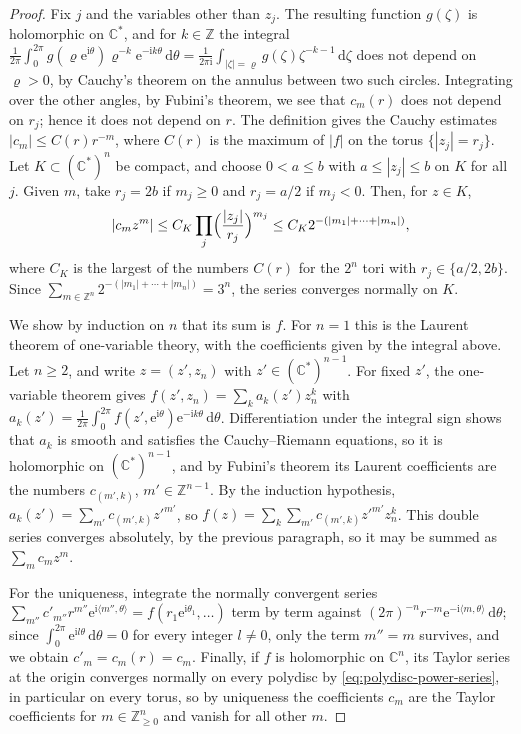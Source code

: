 \begin{proof}
Fix $j$ and the variables other than $z_j$. The resulting function $g(\zeta)$ is holomorphic on $\mathbb C^*$, and for $k\in\mathbb Z$ the integral $\frac1{2\pi}\int_0^{2\pi}g(\varrho\mathrm e^{\mathrm i\theta})\varrho^{-k}\mathrm e^{-\mathrm ik\theta}\,\mathrm d\theta=\frac1{2\pi\mathrm i}\int_{|\zeta|=\varrho}g(\zeta)\zeta^{-k-1}\,\mathrm d\zeta$ does not depend on $\varrho>0$, by Cauchy's theorem on the annulus between two such circles. Integrating over the other angles, by Fubini's theorem, we see that $c_m(r)$ does not depend on $r_j$; hence it does not depend on $r$. The definition gives the Cauchy estimates $|c_m|\leq C(r)r^{-m}$, where $C(r)$ is the maximum of $|f|$ on the torus $\{|z_j|=r_j\}$. Let $K\subset(\mathbb C^*)^n$ be compact, and choose $0<a\leq b$ with $a\leq|z_j|\leq b$ on $K$ for all $j$. Given $m$, take $r_j=2b$ if $m_j\geq0$ and $r_j=a/2$ if $m_j<0$. Then, for $z\in K$,
\[
 |c_mz^m|\leq C_K\prod_j\Bigl(\frac{|z_j|}{r_j}\Bigr)^{m_j}\leq C_K2^{-(|m_1|+\cdots+|m_n|)},
\]
where $C_K$ is the largest of the numbers $C(r)$ for the $2^n$ tori with $r_j\in\{a/2,2b\}$. Since $\sum_{m\in\mathbb Z^n}2^{-(|m_1|+\cdots+|m_n|)}=3^n$, the series converges normally on $K$.

We show by induction on $n$ that its sum is $f$. For $n=1$ this is the Laurent theorem of one-variable theory, with the coefficients given by the integral above. Let $n\geq2$, and write $z=(z',z_n)$ with $z'\in(\mathbb C^*)^{n-1}$. For fixed $z'$, the one-variable theorem gives $f(z',z_n)=\sum_ka_k(z')z_n^k$ with $a_k(z')=\frac1{2\pi}\int_0^{2\pi}f(z',\mathrm e^{\mathrm i\theta})\mathrm e^{-\mathrm ik\theta}\,\mathrm d\theta$. Differentiation under the integral sign shows that $a_k$ is smooth and satisfies the Cauchy--Riemann equations, so it is holomorphic on $(\mathbb C^*)^{n-1}$, and by Fubini's theorem its Laurent coefficients are the numbers $c_{(m',k)}$, $m'\in\mathbb Z^{n-1}$. By the induction hypothesis, $a_k(z')=\sum_{m'}c_{(m',k)}z'^{m'}$, so $f(z)=\sum_k\sum_{m'}c_{(m',k)}z'^{m'}z_n^k$. This double series converges absolutely, by the previous paragraph, so it may be summed as $\sum_mc_mz^m$.

For the uniqueness, integrate the normally convergent series $\sum_{m''}c'_{m''}r^{m''}\mathrm e^{\mathrm i\langle m'',\theta\rangle}=f(r_1\mathrm e^{\mathrm i\theta_1},\ldots)$ term by term against $(2\pi)^{-n}r^{-m}\mathrm e^{-\mathrm i\langle m,\theta\rangle}\,\mathrm d\theta$; since $\int_0^{2\pi}\mathrm e^{\mathrm il\theta}\,\mathrm d\theta=0$ for every integer $l\neq0$, only the term $m''=m$ survives, and we obtain $c'_m=c_m(r)=c_m$. Finally, if $f$ is holomorphic on $\mathbb C^n$, its Taylor series at the origin converges normally on every polydisc by \eqref{eq:polydisc-power-series}, in particular on every torus, so by uniqueness the coefficients $c_m$ are the Taylor coefficients for $m\in\mathbb Z_{\geq0}^n$ and vanish for all other $m$.
\end{proof}

